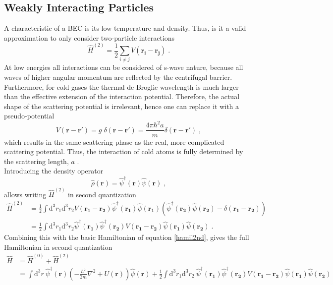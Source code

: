 \subsection{Weakly Interacting Particles}
A characteristic of a BEC is its low temperature and density. Thus, is it a valid approximation to only consider two-particle interactions
\begin{equation}
	\hat{H}^{(2)} = \frac{1}{2} \sum_{i \neq j} V(\boldsymbol{r_i} - \boldsymbol{r_j}) \; .
\end{equation}
At low energies all interactions can be considered of s-wave nature, because
all waves of higher angular momentum are reflected by the centrifugal barrier. Furthermore, for cold gases the thermal de Broglie wavelength is much larger than the effective extension of the interaction potential. Therefore, the actual shape of the scattering potential is irrelevant, hence one can replace it with a pseudo-potential
\begin{equation}
	V(\boldsymbol{r} - \boldsymbol{r'}) = g \; \delta(\boldsymbol{r} - \boldsymbol{r'}) = \frac{4 \pi \hbar^2 a}{m} \delta(\boldsymbol{r} - \boldsymbol{r'}) \; ,
\end{equation}
which results in the same scattering phase as the real, more complicated scattering potential. Thus, the interaction of cold atoms is fully determined by the scattering length, $a$ \cite{greiner}.\\
Introducing the density operator
\begin{equation}
	\hat{\rho}(\boldsymbol{r}) = \hat{\psi}^{\dag}(\boldsymbol{r}) \hat{\psi}(\boldsymbol{r}) \; ,
\end{equation}
allows writing $\hat{H}^{(2)}$ in second quantization
\begin{align}
	\hat{H}^{(2)} &= \frac{1}{2} \int \mathrm{d^3}r_1 \mathrm{d^3}r_2 V(\boldsymbol{r_1} - \boldsymbol{r_2}) \hat{\psi}^{\dag}(\boldsymbol{r_1}) \hat{\psi}(\boldsymbol{r_1}) \left( \hat{\psi}^{\dag}(\boldsymbol{r_2}) \hat{\psi}(\boldsymbol{r_2}) - \delta(\boldsymbol{r_1} - \boldsymbol{r_2}) \right) \\
	&= \frac{1}{2} \int \mathrm{d^3}r_1 \mathrm{d^3}r_2  \hat{\psi}^{\dag}(\boldsymbol{r_1}) \hat{\psi}^{\dag}(\boldsymbol{r_2}) V(\boldsymbol{r_1} - \boldsymbol{r_2}) \hat{\psi}(\boldsymbol{r_1}) \hat{\psi}(\boldsymbol{r_2}) \; .
\end{align}
Combining this with the basic Hamiltonian of equation \eqref{hamil2nd}, gives the full Hamiltonian in second quantization
\begin{align}
	\hat{H} &= \hat{H}^{(0)} + \hat{H}^{(2)} \\
	& = \int \mathrm{d^3}r \ \hat{\psi}^{\dag}(\boldsymbol{r}) \left( - \frac{\hbar^2}{2 m} \nabla^2 + U(\boldsymbol{r})\right) \hat{\psi}(\boldsymbol{r}) + \frac{1}{2} \int \mathrm{d^3}r_1 \mathrm{d^3}r_2  \ \hat{\psi}^{\dag}(\boldsymbol{r_1}) \hat{\psi}^{\dag}(\boldsymbol{r_2}) V(\boldsymbol{r_1} - \boldsymbol{r_2}) \hat{\psi}(\boldsymbol{r_1}) \hat{\psi}(\boldsymbol{r_2})
	\label{hamilint}
\end{align}
